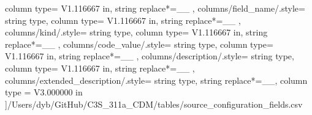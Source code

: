 \begin{landscape}
{            column type= V{1.116667 in}, 
            string replace*={_}{\_}
        },
    columns/field_name/.style={
            string type, 
            column type= V{1.116667 in}, 
            string replace*={_}{\_}
        },
    columns/kind/.style={
            string type, 
            column type= V{1.116667 in}, 
            string replace*={_}{\_}
        },
    columns/code_value/.style={
            string type, 
            column type= V{1.116667 in}, 
            string replace*={_}{\_}
        },
    columns/description/.style={
            string type, 
            column type= V{1.116667 in}, 
            string replace*={_}{\_}
        },
    columns/extended_description/.style={
            string type, 
            string replace*={_}{\_},
            column type = V{3.000000 in}
        }
    ]{/Users/dyb/GitHub/C3S_311a_CDM/tables/source_configuration_fields.csv}
\end{landscape}
